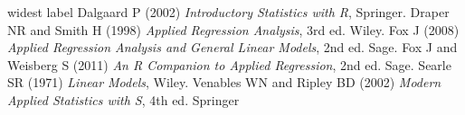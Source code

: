 \documentclass[11pt, oneside]{article}   	%
\begin{document}
\begin{thebibliography}
{widest label}
 Dalgaard P (2002) \emph{Introductory Statistics with R}, Springer.
 Draper NR and Smith H (1998) \emph{Applied Regression Analysis}, 3rd ed. Wiley.
 Fox J (2008) \emph{Applied Regression Analysis and General Linear Models}, 2nd ed. Sage.
 Fox J and Weisberg S (2011) \emph{An R Companion to Applied Regression}, 2nd ed. Sage.
 Searle SR (1971) \emph{Linear Models}, Wiley.
 Venables WN and Ripley BD (2002) \emph{Modern Applied Statistics with S}, 4th ed. Springer


\end{thebibliography}



\bigskip
\bigskip
\end{document}
